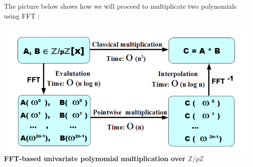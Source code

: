 The picture below shows how we will proceed to multiplicate two polynomials using FFT : \\

\begin{center}
\includegraphics[scale=0.5]{FFT.png}
\textbf{FFT-based univariate polynomial multiplication over $\mathbb{Z}/p\mathbb{Z}$}
\end{center}

